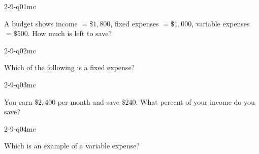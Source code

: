 

\begin{practiceQuestion}{2-9-q01}{mc}
\begin{questionText}
A budget shows income $= \$1{,}800$, fixed expenses $= \$1{,}000$, variable expenses $= \$500$. How much is left to save?
\end{questionText}
\end{practiceQuestion}

\begin{practiceQuestion}{2-9-q02}{mc}
\begin{questionText}
Which of the following is a fixed expense?
\end{questionText}
\end{practiceQuestion}

\begin{practiceQuestion}{2-9-q03}{mc}
\begin{questionText}
You earn $\$2{,}400$ per month and save $\$240$. What percent of your income do you save?
\end{questionText}
\end{practiceQuestion}

\begin{practiceQuestion}{2-9-q04}{mc}
\begin{questionText}
Which is an example of a variable expense?
\end{questionText}
\end{practiceQuestion}

